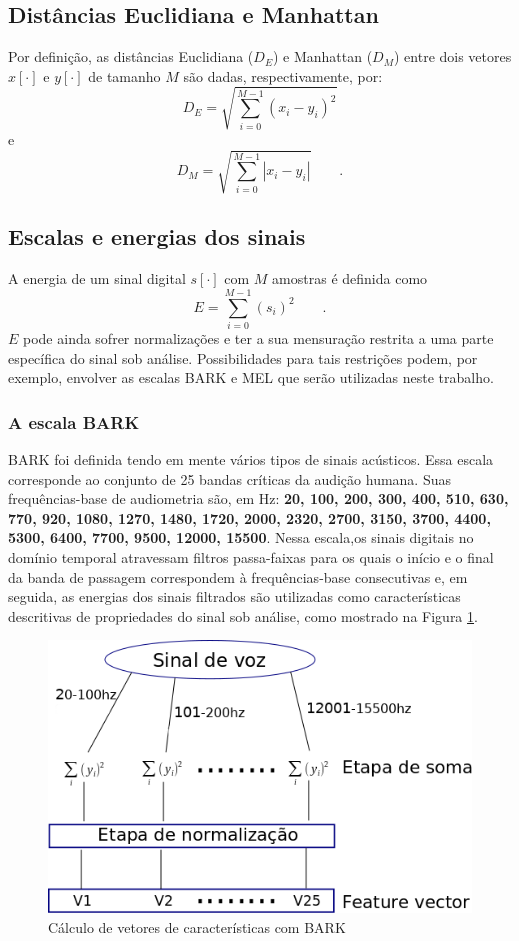 \subsection{Distâncias Euclidiana e Manhattan}
    \par Por definição, as distâncias Euclidiana ($D_E$) e Manhattan ($D_M$) entre dois vetores $x[\cdot]$ e $y[\cdot]$ de tamanho $M$ são dadas, respectivamente, por:
    \begin{equation}
     D_E = \sqrt{\sum\limits_{i=0}^{M-1}(x_i - y_i)^2}   
    \end{equation}
	e
    \begin{equation}
        D_M = \sqrt{\sum\limits_{i=0}^{M-1}|x_i - y_i|}   
        \qquad. 
    \end{equation}

\subsection{Escalas e energias dos sinais}
	\par A energia de um sinal digital $s[\cdot]$ com $M$ amostras é definida como
	\begin{equation}
	E = \sum\limits_{i=0}^{M-1}(s_i)^2 \qquad.   
	\end{equation}
	$E$ pode ainda sofrer normalizações e ter a sua mensuração restrita a uma parte específica do sinal sob análise. Possibilidades para tais restrições podem, por exemplo, envolver as escalas BARK \cite{doi:10.1121-1.1908630} e MEL \cite{beranek1949acoustic} que serão utilizadas neste trabalho.
	\subsubsection{A escala BARK}
		\par BARK foi definida tendo em mente vários tipos de sinais acústicos. Essa escala corresponde ao conjunto de 25 bandas críticas da audição humana. Suas frequências-base de audiometria são, em Hz: \textbf{20, 100, 200, 300, 400, 510, 630, 770, 920, 1080, 1270, 1480, 1720, 2000, 2320, 2700, 3150, 3700, 4400, 5300, 6400, 7700, 9500, 12000, 15500}. Nessa escala,os sinais digitais no domínio temporal atravessam filtros passa-faixas \cite{bosi2002introduction} para os quais o início e o final da banda de passagem correspondem à frequências-base consecutivas e, em seguida, as energias dos sinais filtrados são utilizadas como características descritivas de propriedades do sinal sob análise, como mostrado na Figura \ref{fig:barkfeaturevect}.
		\begin{figure}[h]
			\centering
			\includegraphics[width=0.6\linewidth]{images/barkFeatureVect}
			\caption{Cálculo de vetores de características com BARK}
			\label{fig:barkfeaturevect}
		\end{figure}
